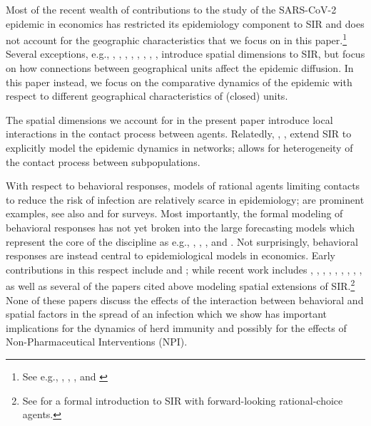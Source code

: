 \documentclass[english,11pt]{article}
\begin{document}
Most of the recent wealth of contributions to the study of the SARS-CoV-2 epidemic in economics has  restricted its epidemiology component to SIR and does  not account
for the geographic characteristics that we focus on in this paper.\footnote{See e.g., \cite{atkeson2020will}, \cite{eichenbaum2020macroeconomics},  \cite{brotherhood2020economic}, and \cite{jarosch2020internal}}
Several  exceptions, e.g., 
\cite{argente2020cost},
\cite{antras2020globalization}, \cite{birge2020controlling},  \cite{bognanni2020economic}, \cite{cua2020structural}, \cite{fajgelbaum2020optimal}, \cite{giannone}, \cite{glaeser2020much}, introduce spatial dimensions to SIR, but focus on how connections between  geographical units affect the epidemic diffusion. In this paper instead, we focus on the comparative dynamics of the epidemic  with respect to different geographical characteristics of (closed) units.

The spatial dimensions we account for in the present paper introduce local interactions in the contact process between agents. Relatedly,  \cite{acemoglu2020testing}, \cite{alfaro2020social},  \cite{Azzimontietal2020}  extend SIR to explicitly model the epidemic dynamics in networks; \cite{ellison} allows for heterogeneity of the contact process between subpopulations.

With respect to behavioral responses, models of rational agents limiting contacts to reduce the risk of  infection are relatively scarce in epidemiology; \cite{fenichel2013economic} \cite{weitz2020moving} are prominent examples, see also \cite{funk2010modelling} and  \cite{verelst2016behavioural}  for surveys. Most importantly, the formal modeling of behavioral responses has not yet broken into the large forecasting models which represent the core of the discipline as e.g., \cite{balcan2009multiscale}, \cite{balcan2010modeling}, \cite{chinazzi2020effect}, and   \cite{ferguson2020report}. 
Not surprisingly, behavioral responses are instead central to epidemiological models in economics. Early contributions in this respect include \cite{geoffard1996rational} and  \cite{goenka2012infectious}; while recent work includes 
\cite{acemoglu2020multi}, 
\cite{aguirre}, \cite{argente2020cost}, 
\cite{bethune2020covid}, \cite{farboodi2020}, \cite{fernandez2020estimating}, 
\cite{greenwood2019equilibrium},
\cite{keppo2020behavioral},   \cite{toxvaerd2020equilibrium}, as well as several of the papers cited above modeling spatial extensions of SIR.\footnote{See \cite{BisinMoroRat2020} for a formal introduction to SIR with forward-looking rational-choice agents.} None of these papers discuss the effects of the interaction between behavioral and spatial factors in the spread of an infection which we show has important implications for the dynamics of herd immunity and possibly for the effects of Non-Pharmaceutical Interventions (NPI). 
\end{document}
